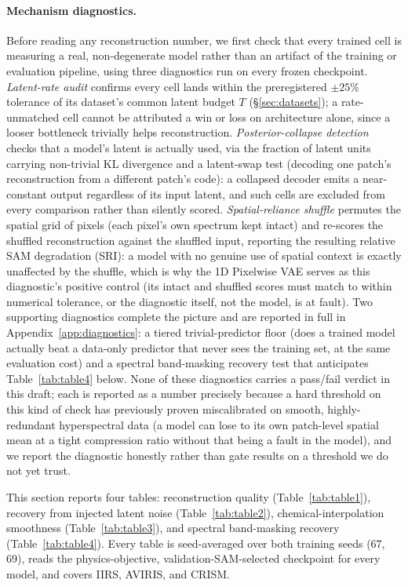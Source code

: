 \documentclass{article} %
\begin{document}
\paragraph{Mechanism diagnostics.} Before reading any reconstruction number, we first check that every trained cell is measuring a real, non-degenerate model rather than an artifact of the training or evaluation pipeline, using three diagnostics run on every frozen checkpoint. \emph{Latent-rate audit} confirms every cell lands within the preregistered $\pm25\%$ tolerance of its dataset's common latent budget $T$ (\S\ref{sec:datasets}); a rate-unmatched cell cannot be attributed a win or loss on architecture alone, since a looser bottleneck trivially helps reconstruction. \emph{Posterior-collapse detection} checks that a model's latent is actually used, via the fraction of latent units carrying non-trivial KL divergence and a latent-swap test (decoding one patch's reconstruction from a different patch's code): a collapsed decoder emits a near-constant output regardless of its input latent, and such cells are excluded from every comparison rather than silently scored. \emph{Spatial-reliance shuffle} permutes the spatial grid of pixels (each pixel's own spectrum kept intact) and re-scores the shuffled reconstruction against the shuffled input, reporting the resulting relative SAM degradation (SRI): a model with no genuine use of spatial context is exactly unaffected by the shuffle, which is why the 1D Pixelwise VAE serves as this diagnostic's positive control (its intact and shuffled scores must match to within numerical tolerance, or the diagnostic itself, not the model, is at fault). Two supporting diagnostics complete the picture and are reported in full in Appendix~\ref{app:diagnostics}: a tiered trivial-predictor floor (does a trained model actually beat a data-only predictor that never sees the training set, at the same evaluation cost) and a spectral band-masking recovery test that anticipates Table~\ref{tab:table4} below. None of these diagnostics carries a pass/fail verdict in this draft; each is reported as a number precisely because a hard threshold on this kind of check has previously proven miscalibrated on smooth, highly-redundant hyperspectral data (a model can lose to its own patch-level spatial mean at a tight compression ratio without that being a fault in the model), and we report the diagnostic honestly rather than gate results on a threshold we do not yet trust.

This section reports four tables: reconstruction quality (Table~\ref{tab:table1}), recovery from injected latent noise (Table~\ref{tab:table2}), chemical-interpolation smoothness (Table~\ref{tab:table3}), and spectral band-masking recovery (Table~\ref{tab:table4}). Every table is seed-averaged over both training seeds (67, 69), reads the physics-objective, validation-SAM-selected checkpoint for every model, and covers IIRS, AVIRIS, and CRISM.
\end{document}

